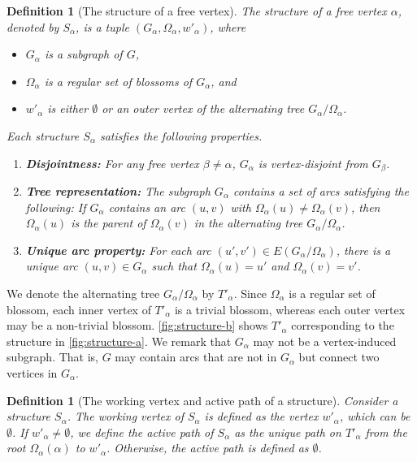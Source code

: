 \documentclass{article}
\newcommand{\alp}{\alpha}
\newcommand{\Omg}{\Omega}
\newtheorem{definition}[theorem]{Definition}
\begin{document}
\begin{definition}[The structure of a free vertex] \label{def:structure}
The structure of a free vertex $\alp$, denoted by $S_\alp$, is a tuple $(G_\alp, \Omg_\alp, w'_\alp)$, where 
\begin{itemize}
    \item $G_\alp$ is a subgraph of $G$,
    \item $\Omg_\alp$ is a regular set of blossoms of $G_\alp$, and 
    \item $w'_\alp$ is either $\emptyset$ or an outer vertex of the alternating tree $G_\alp / \Omg_\alp$.
\end{itemize} 
Each structure $S_\alp$ satisfies the following properties.
\begin{enumerate}
    \item \textbf{Disjointness:} For any free vertex $\beta \neq \alp$, $G_\alp$ is vertex-disjoint from $G_\beta$.
    \item \textbf{Tree representation:} The subgraph $G_\alp$ contains a set of arcs satisfying the following: If $G_\alp$ contains an arc $(u, v)$ with $\Omg_\alp(u) \neq \Omg_\alp(v)$, then $\Omg_\alp(u)$ is the parent of $\Omg_\alp(v)$ in the alternating tree $G_\alp / \Omg_\alp$.
    \item \textbf{Unique arc property:} For each arc $(u', v') \in E(G_\alp / \Omg_\alp)$, there is a unique arc $(u, v) \in G_\alp$ such that $\Omg_\alp(u) = u'$ and $\Omg_\alp(v) = v'$. \label{def:unique-arc}
\end{enumerate}
\end{definition}

\noindent We denote the alternating tree $G_\alp / \Omg_\alp$ by $T'_\alp$.
Since $\Omg_\alp$ is a regular set of blossom, each inner vertex of $T'_\alp$ is a trivial blossom, whereas each outer vertex may be a non-trivial blossom.
\cref{fig:structure-b} shows $T'_\alp$ corresponding to the structure in \cref{fig:structure-a}.
We remark that $G_\alp$ may not be a vertex-induced subgraph.
That is, $G$ may contain arcs that are not in $G_\alp$ but connect two vertices in $G_\alp$.

\begin{definition}[The working vertex and active path of a structure] Consider a structure $S_\alp$. 
The \emph{working vertex} of $S_\alp$ is defined as the vertex $w'_\alp$, which can be $\emptyset$.
If $w'_\alp \neq \emptyset$, we define the \emph{active path} of $S_\alp$ as the unique path on $T'_\alp$ from the root $\Omg_\alp(\alp)$ to $w'_\alp$.
Otherwise, the active path is defined as $\emptyset$.
\end{definition}
\end{document}
